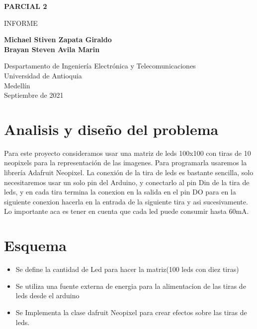 \documentclass{article}
\begin{document}
\begin{titlepage}
    \begin{center}
        \vspace*{1cm}
            
        \Huge
        \textbf{PARCIAL 2}
            
        \vspace{0.5cm}
        \LARGE
        INFORME
            
        \vspace{1.5cm}
            
        \textbf{Michael Stiven Zapata Giraldo\\Brayan Steven Avila Marin}
            
        \vfill
            
        \vspace{0.8cm}
            
        \Large
        Despartamento de Ingeniería Electrónica y Telecomunicaciones\\
        Universidad de Antioquia\\
        Medellín\\
        Septiembre de 2021
            
    \end{center}
\end{titlepage}

\tableofcontents
\newpage
\section{ Analisis y diseño del problema }\label{intro}

Para este proyecto consideramos usar una matriz de leds 100x100 con tiras de 10 neopixels para la representación de las imagenes. Para programarla usaremos la librería Adafruit Neopixel. La conexión de la tira de leds es bastante sencilla, solo necesitaremos usar un solo pin del Arduino, y conectarlo al pin Din de la tira de leds, y en cada tira termina la conexion en la salida en el pin DO para en la siguiente conexion hacerla en la entrada de la siguiente tira y asi sucesivamente. Lo importante aca es tener en cuenta que cada led puede consumir hasta 60mA.

\section{Esquema}  
\begin{itemize}
\item Se define la cantidad de Led para hacer la matriz(100 leds con diez tiras)
\item Se utiliza una fuente externa de energia para la alimentacion de las tiras de leds desde el arduino
\item Se Implementa la clase dafruit Neopixel para crear efectos sobre las tiras de leds.

\end{itemize}
\end{document}
